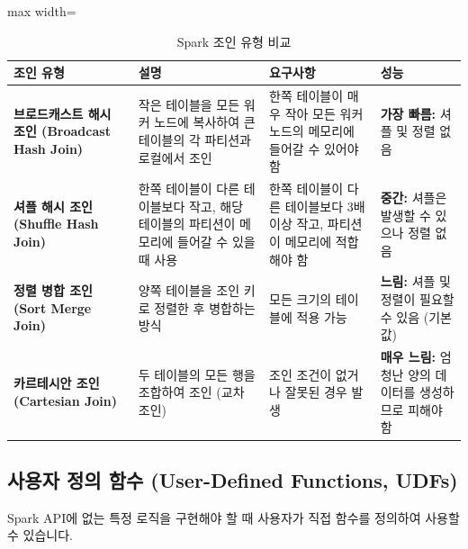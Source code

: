 \documentclass[11pt,a4paper]{article}
\theoremstyle{definition}
\begin{document}
\begin{table}[h!]
\centering
\caption{Spark 조인 유형 비교}
\label{tab:spark_join_types}
\begin{adjustbox}{max width=\textwidth}
\begin{tabular}{p{}p{}p{}p{}}
\toprule
\textbf{조인 유형} & \textbf{설명} & \textbf{요구사항} & \textbf{성능} \\
\midrule
\textbf{브로드캐스트 해시 조인 (Broadcast Hash Join)} & 작은 테이블을 모든 워커 노드에 복사하여 큰 테이블의 각 파티션과 로컬에서 조인 & 한쪽 테이블이 매우 작아 모든 워커 노드의 메모리에 들어갈 수 있어야 함 & \textbf{가장 빠름:} 셔플 및 정렬 없음 \\
\textbf{셔플 해시 조인 (Shuffle Hash Join)} & 한쪽 테이블이 다른 테이블보다 작고, 해당 테이블의 파티션이 메모리에 들어갈 수 있을 때 사용 & 한쪽 테이블이 다른 테이블보다 3배 이상 작고, 파티션이 메모리에 적합해야 함 & \textbf{중간:} 셔플은 발생할 수 있으나 정렬 없음 \\
\textbf{정렬 병합 조인 (Sort Merge Join)} & 양쪽 테이블을 조인 키로 정렬한 후 병합하는 방식 & 모든 크기의 테이블에 적용 가능 & \textbf{느림:} 셔플 및 정렬이 필요할 수 있음 (기본값) \\
\textbf{카르테시안 조인 (Cartesian Join)} & 두 테이블의 모든 행을 조합하여 조인 (교차 조인) & 조인 조건이 없거나 잘못된 경우 발생 & \textbf{매우 느림:} 엄청난 양의 데이터를 생성하므로 피해야 함 \\
\bottomrule
\end{tabular}
\end{adjustbox}
\end{table}

\subsection{사용자 정의 함수 (User-Defined Functions, UDFs)}
Spark API에 없는 특정 로직을 구현해야 할 때 사용자가 직접 함수를 정의하여 사용할 수 있습니다.
\end{document}
